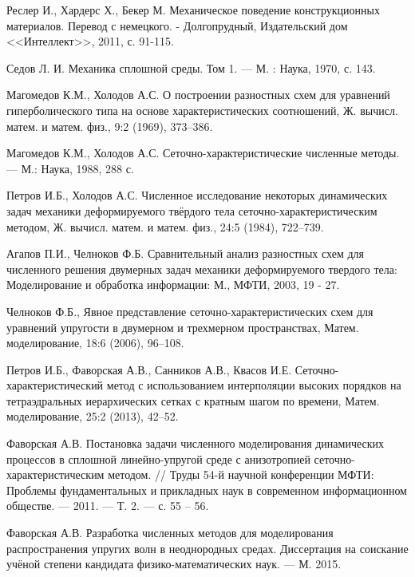 \begin{thebibliography}{99}

 Реслер И., Хардерс Х., Бекер М. Механическое поведение конструкционных материалов. Перевод с немецкого. - Долгопрудный, Издательский дом <<Интеллект>>, 2011, с. 91-115.

 Седов Л. И. Механика сплошной среды. Том 1. — М. : Наука, 1970, с. 143.

 Магомедов К.М., Холодов А.С. О построении разностных схем для уравнений гиперболического типа на основе характеристических соотношений, Ж. вычисл. матем. и матем. физ., 9:2 (1969), 373–386.

 Магомедов К.М., Холодов А.С. Сеточно-характеристические численные методы. — М.: Наука, 1988, 288 с.

 Петров И.Б., Холодов А.С. Численное исследование некоторых динамических задач механики деформируемого твёрдого тела сеточно-характеристическим методом, Ж. вычисл. матем. и матем. физ., 24:5 (1984), 722–739.

 Агапов П.И., Челноков Ф.Б. Сравнительный анализ разностных схем для численного решения двумерных задач механики деформируемого твердого тела: Моделирование и обработка информации: М., МФТИ, 2003, 19 - 27.

 Челноков Ф.Б., Явное представление сеточно-характеристических схем для уравнений упругости в двумерном и трехмерном пространствах, Матем. моделирование, 18:6 (2006), 96–108.

 Петров И.Б., Фаворская А.В., Санников А.В., Квасов И.Е. Сеточно-характеристический метод с использованием интерполяции высоких порядков на тетраэдральных иерархических сетках с кратным шагом по времени, Матем. моделирование, 25:2 (2013), 42–52.

 Фаворская А.В. Постановка задачи численного моделирования динамических процессов в сплошной линейно-упругой среде с анизотропией сеточно-характеристическим методом. // Труды 54-й научной конференции МФТИ: Проблемы фундаментальных и прикладных наук в современном информационном обществе. — 2011. — Т. 2. — с. 55 – 56.

\small
{} Фаворская А.В. Разработка численных методов для моделирования распространения упругих волн в неоднородных средах. Диссертация на соискание учёной степени кандидата физико-математических наук. — М. 2015.


\end{thebibliography}

